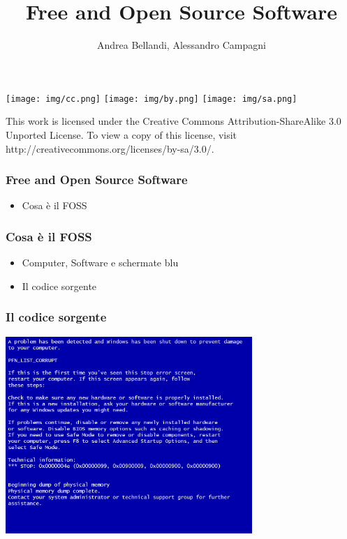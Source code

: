 \documentclass{beamer}
\title{Free and Open Source Software}
\author{Andrea Bellandi, Alessandro Campagni}
\begin{document}
\begin{frame}
  \titlepage

\vfill
\texttt{[image: img/cc.png]}
\texttt{[image: img/by.png]}
\texttt{[image: img/sa.png]}

This work is licensed under the Creative Commons
Attribution-ShareAlike 3.0 Unported License. 
To view a copy of this license, visit 
http://creativecommons.org/licenses/by-sa/3.0/.
\end{frame}

\begin{frame}
  \frametitle{Free and Open Source Software}

  \begin{itemize}
    \item Cosa \`e il FOSS
  \end{itemize}

\end{frame}


\begin{frame}
  \frametitle{Cosa \`e il FOSS}

  \begin{itemize}
    \item<1-> Computer, Software e schermate blu
    \item<2-> Il codice sorgente
  \end{itemize}

\end{frame}


\begin{frame}
  \frametitle{Il codice sorgente}

  \begin{center}
      \includegraphics[width=0.7\textwidth]{img/bsod.jpg}
  \end{center}

\end{frame}
\end{document}
